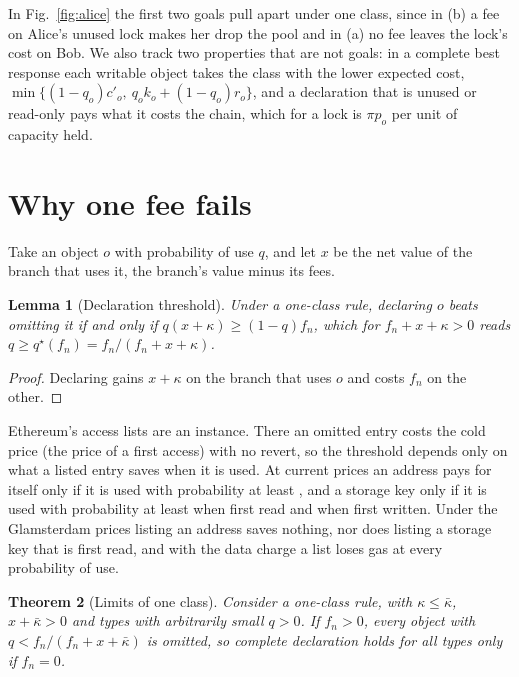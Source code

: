 \documentclass[conference,compsoc]{IEEEtran}
\numberwithin{equation}{section}
\theoremstyle{plain}
\newtheorem{theorem}{Theorem}[section]
\newtheorem{lemma}[theorem]{Lemma}
\theoremstyle{definition}
\theoremstyle{remark}
\newcommand{\cp}{c'}
\begin{document}
In Fig.~\ref{fig:alice} the first two goals pull apart under one class, since in (b) a fee on Alice's unused lock makes her drop the pool and in (a) no fee leaves the lock's cost on Bob. We also track two properties that are not goals: in a complete best response each writable object takes the class with the lower expected cost, $\min\{(1-q_o)\cp_o,\ q_o k_o + (1-q_o) r_o\}$, and a declaration that is unused or read-only pays what it costs the chain, which for a lock is $\pi p_o$ per unit of capacity held.

\section{Why one fee fails}\label{sec:oneclass}

Take an object $o$ with probability of use $q$, and let $x$ be the net value of the branch that uses it, the branch's value minus its fees.

\begin{lemma}[Declaration threshold]\label{prop:threshold}
Under a one-class rule, declaring $o$ beats omitting it if and only if $q(x+\kappa) \ge (1-q) f_n$, which for $f_n + x + \kappa > 0$ reads $q \ge q^\star(f_n) = f_n/(f_n + x + \kappa)$.
\end{lemma}

\begin{proof}
Declaring gains $x + \kappa$ on the branch that uses $o$ and costs $f_n$ on the other.
\end{proof}

Ethereum's access lists are an instance. There an omitted entry costs the cold price (the price of a first access) with no revert, so the threshold depends only on what a listed entry saves when it is used. At current prices an address pays for itself only if it is used with probability at least \listThresholdAddr{}, and a storage key only if it is used with probability at least \listThresholdKey{} when first read and \listThresholdKeyWrite{} when first written. Under the Glamsterdam prices listing an address saves nothing, nor does listing a storage key that is first read, and with the data charge a list loses gas at every probability of use.

\begin{theorem}[Limits of one class]\label{thm:oneclass}
Consider a one-class rule, with $\kappa \le \bar\kappa$, $x + \bar\kappa > 0$ and types with arbitrarily small $q > 0$. If $f_n > 0$, every object with $q < f_n/(f_n + x + \bar\kappa)$ is omitted, so complete declaration holds for all types only if $f_n = 0$.
\end{theorem}
\end{document}
